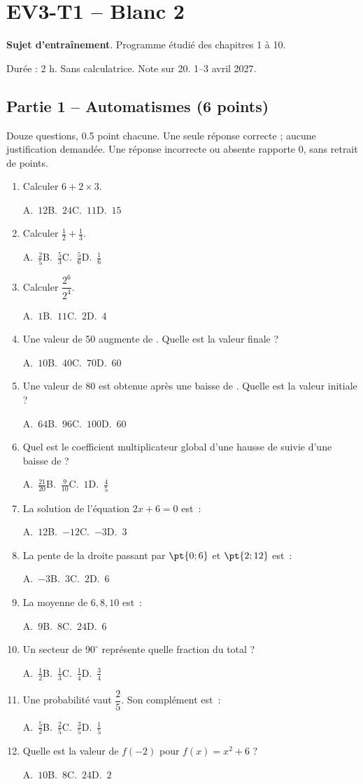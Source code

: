 \mxnewpage\section*{EV3-T1 -- Blanc 2}\label{EV3-T1}
\textbf{Sujet d’entraînement}. Programme étudié des chapitres 1 à 10.\par Durée : 2 h. Sans calculatrice. Note sur 20. 1–3 avril 2027.
\subsection*{Partie 1 -- Automatismes (6 points)}
Douze questions, \num{0,5} point chacune. Une seule réponse correcte ; aucune justification demandée. Une réponse incorrecte ou absente rapporte 0, sans retrait de points.
\begin{enumerate}
\item Calculer $6+2\times3$.\par A.~$12$\quad B.~$24$\quad C.~$11$\quad D.~$15$
\item Calculer $\frac12+\frac13$.\par A.~$\frac{2}{5}$\quad B.~$\frac{5}{3}$\quad C.~$\frac{5}{6}$\quad D.~$\frac{1}{6}$
\item Calculer $\dfrac{2^6}{2^{4}}$.\par A.~$1$\quad B.~$11$\quad C.~$2$\quad D.~$4$
\item Une valeur de 50 augmente de . Quelle est la valeur finale ?\par A.~$10$\quad B.~$40$\quad C.~$70$\quad D.~$60$
\item Une valeur de 80 est obtenue après une baisse de . Quelle est la valeur initiale ?\par A.~$64$\quad B.~$96$\quad C.~$100$\quad D.~$60$
\item Quel est le coefficient multiplicateur global d’une hausse de  suivie d’une baisse de  ?\par A.~$\frac{21}{20}$\quad B.~$\frac{9}{10}$\quad C.~$1$\quad D.~$\frac{4}{5}$
\item La solution de l’équation $2x+6=0$ est~:\par A.~$12$\quad B.~$-12$\quad C.~$-3$\quad D.~$3$
\item La pente de la droite passant par $\pt{0;6}$ et $\pt{2;12}$ est~:\par A.~$-3$\quad B.~$3$\quad C.~$2$\quad D.~$6$
\item La moyenne de $6, 8, 10$ est~:\par A.~$9$\quad B.~$8$\quad C.~$24$\quad D.~$6$
\item Un secteur de $90^\circ$ représente quelle fraction du total ?\par A.~$\frac{1}{2}$\quad B.~$\frac{1}{3}$\quad C.~$\frac{1}{4}$\quad D.~$\frac{3}{4}$
\item Une probabilité vaut $\dfrac{2}{5}$. Son complément est~:\par A.~$\frac{5}{2}$\quad B.~$\frac{2}{5}$\quad C.~$\frac{3}{5}$\quad D.~$\frac{1}{5}$
\item Quelle est la valeur de $f(-2)$ pour $f(x)=x^2+6$ ?\par A.~$10$\quad B.~$8$\quad C.~$24$\quad D.~$2$
\end{enumerate}
